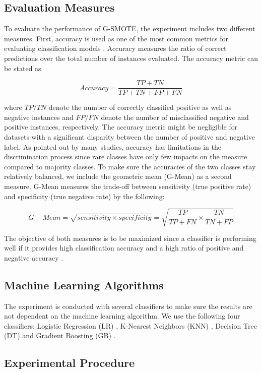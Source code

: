 \documentclass[parskip=full]{scrartcl}
\begin{document}
\subsection{Evaluation Measures}

To evaluate the performance of G-SMOTE, the experiment includes two different 
measures. First, accuracy is used as one of the most common metrics for 
evaluating classification models \cite{M.2015}. Accuracy measures 
the ratio of correct predictions over the total number of instances evaluated. 
The accuracy metric can be stated as

$$Accuracy = \frac{TP + TN}{TP +TN + FP + FN}$$

where \(TP / TN\) denote the number of correctly classified positive as 
well as negative instances and \(FP / FN\) denote the number of 
misclassified negative and positive instances, respectively. The accuracy 
metric might be negligible for datasets with a significant disparity between 
the number of positive and negative label. As pointed out by many studies, 
accuracy has limitations in the discrimination process since rare classes have 
only few impacts on the measure compared to majority classes. To make sure the 
accuracies of the two classes stay relatively balanced, we include the 
geometric mean (G-Mean) as a second measure. G-Mean measures the trade-off 
between sensitivity (true positive rate) and specificity (true negative rate) 
by the following:

$$G-Mean = \sqrt{sensitivity \times specificity} = \sqrt{\dfrac{TP}{TP + FN} 
\times \dfrac{TN}{TN + FP}}$$

The objective of both measures is to be maximized since a classifier is 
performing well if it provides high classification accuracy and a high ratio of 
positive and negative accuracy \cite{Han.2012}. 

\subsection{Machine Learning Algorithms}

The experiment is conducted with several classifiers to make sure the results 
are not dependent on the machine learning algorithm. We use the following four 
classifiers: Logistic Regression (LR) \cite{McCullagh.2019}, K-Nearest 
Neighbors (KNN) \cite{Cover.1967}, Decision Tree (DT) \cite{Salzberg.1994} and 
Gradient Boosting (GB) \cite{Friedman.2001}.

\subsection{Experimental Procedure}
\end{document}
